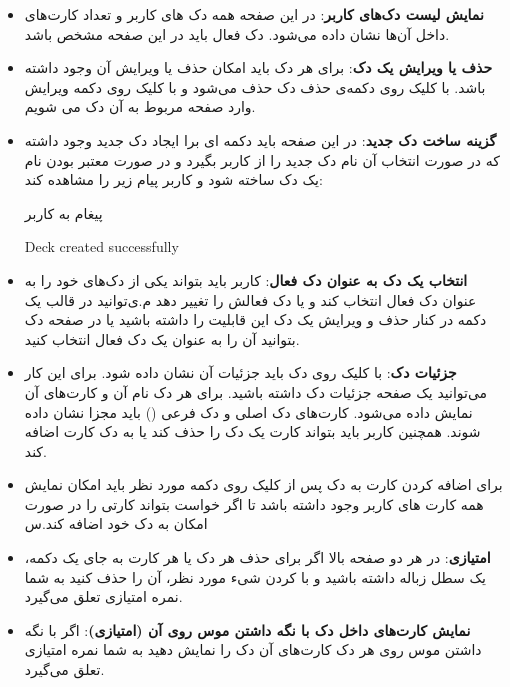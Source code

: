\documentclass[]{article}
\begin{document}
\begin{itemize}
    \item \textbf{نمایش لیست دک‌های کاربر}: در این صفحه همه دک های کاربر و تعداد کارت‌های داخل آن‌ها نشان داده می‌شود. دک فعال باید در این صفحه مشخص باشد.
    \item \textbf{حذف یا ویرایش یک دک}:
     برای هر دک باید امکان حذف یا ویرایش آن وجود داشته باشد. با کلیک روی دکمه‌ی حذف دک حذف می‌شود و با کلیک روی دکمه ویرایش وارد صفحه مربوط به آن دک می شویم.
     
    \item \textbf{گزینه ساخت دک جدید}:
     در این صفحه باید دکمه ای برا ایجاد دک جدید وجود داشته که در صورت انتخاب آن نام دک جدید را از کاربر بگیرد و در صورت معتبر بودن نام  یک دک ساخته شود و کاربر پیام زیر را مشاهده کند:
     
     \begin{mybox}[colback=yellow]{پیغام به کاربر}
     	\begin{latin}	
     		Deck created successfully
     	\end{latin}
     \end{mybox}
 
    \item \textbf{انتخاب یک دک به عنوان دک فعال}:
     کاربر باید بتواند یکی از دک‌های خود را به عنوان دک فعال انتخاب کند و یا دک فعالش را تغییر دهد م.ی‌توانید در قالب یک دکمه در کنار حذف و ویرایش یک دک این قابلیت را داشته باشید یا در صفحه دک بتوانید آن را به عنوان یک دک فعال انتخاب کنید.
     
    \item \textbf{جزئیات دک}:
     با کلیک روی دک باید جزئیات آن نشان داده شود. برای این کار می‌توانید یک صفحه جزئیات دک داشته باشید. برای هر دک نام آن و کارت‌های آن نمایش داده می‌شود. کارت‌های دک اصلی و دک فرعی () باید مجزا نشان داده شوند. همچنین کاربر باید بتواند کارت یک دک را حذف کند یا به دک کارت اضافه کند.
    \item 
    برای اضافه کردن کارت به دک پس از کلیک روی دکمه مورد نظر باید امکان نمایش همه کارت های کاربر وجود داشته باشد تا اگر خواست بتواند کارتی را در صورت امکان به دک خود اضافه کند.س
    \item \textbf{امتیازی}:
     در هر دو صفحه بالا اگر برای حذف هر دک یا هر کارت به جای یک دکمه، یک  سطل زباله داشته باشید و با  کردن شیء مورد  نظر، آن را حذف کنید به شما نمره امتیازی تعلق می‌گیرد.
     
    \item \textbf{نمایش کارت‌های داخل دک با نگه داشتن موس روی آن (امتیازی)}:
    اگر با نگه داشتن موس روی هر دک کارت‌های آن دک را نمایش دهید به شما نمره امتیازی تعلق می‌گیرد.    
\end{itemize}
\end{document}
